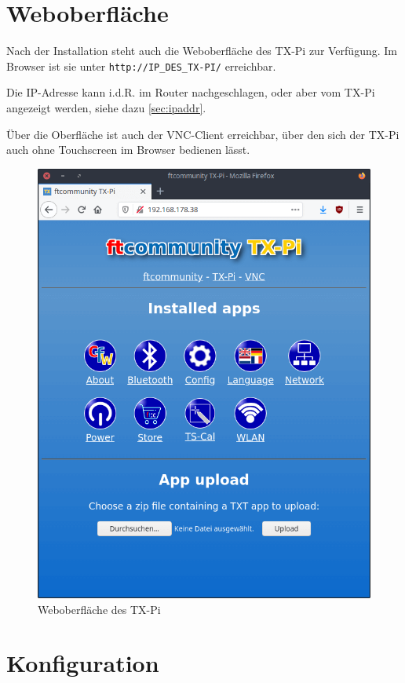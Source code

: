 \documentclass[
  paper=A4,
  ngerman,
  fontsize=12pt,
  parskip=half-,
]{scrbook}
\begin{document}
\chapter{Weboberfläche}

Nach der Installation steht auch die Weboberfläche des TX-Pi zur Verfügung.
Im Browser ist sie unter \texttt{http://IP\_DES\_TX-PI/} erreichbar.

Die IP-Adresse kann i.d.R. im Router nachgeschlagen, oder aber
vom TX-Pi angezeigt werden, siehe dazu \ref{sec:ipaddr}.

Über die Oberfläche ist auch der VNC-Client erreichbar, über den
sich der TX-Pi auch ohne Touchscreen im Browser bedienen lässt.

\begin{figure}[h]
\centering
\includegraphics[scale=0.35]{images/browser.png}
\caption{Weboberfläche des TX-Pi}
\end{figure}


\chapter{Konfiguration}
\label{chapter:config}
\end{document}
